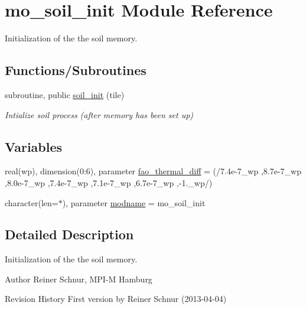 \hypertarget{namespacemo__soil__init}{}\section{mo\+\_\+soil\+\_\+init Module Reference}
\label{namespacemo__soil__init}


Initialization of the the soil memory.  


\subsection*{Functions/\+Subroutines}
\begin{DoxyCompactItemize}
\item 
subroutine, public \hyperlink{namespacemo__soil__init_acd283c148fd4faca32050c04a10218a3}{soil\+\_\+init} (tile)
\begin{DoxyCompactList}\small\item\em Intialize soil process (after memory has been set up) \end{DoxyCompactList}\end{DoxyCompactItemize}
\subsection*{Variables}
\begin{DoxyCompactItemize}
\item 
real(wp), dimension(0\+:6), parameter \hyperlink{namespacemo__soil__init_afcb27ae298e9ae62490306a71b798373}{fao\+\_\+thermal\+\_\+diff} = (/7.\+4e-\/7\+\_\+wp ,8.\+7e-\/7\+\_\+wp ,8.\+0e-\/7\+\_\+wp ,7.\+4e-\/7\+\_\+wp ,7.\+1e-\/7\+\_\+wp ,6.\+7e-\/7\+\_\+wp ,-\/1.\+\_\+wp/)
\item 
character(len=$\ast$), parameter \hyperlink{namespacemo__soil__init_a32fc6da5806ec1cdfa46775e465bda3a}{modname} = \textquotesingle{}mo\+\_\+soil\+\_\+init\textquotesingle{}
\end{DoxyCompactItemize}


\subsection{Detailed Description}
Initialization of the the soil memory. 

\begin{DoxyAuthor}{Author}
Reiner Schnur, M\+P\+I-\/\+M Hamburg
\end{DoxyAuthor}
\begin{DoxyParagraph}{Revision History}
First version by Reiner Schnur (2013-\/04-\/04) 
\end{DoxyParagraph}


